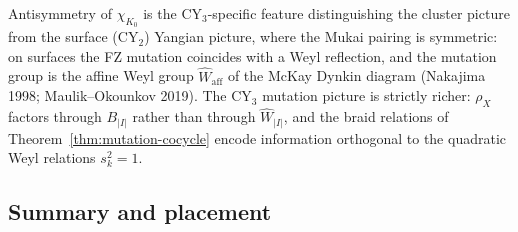 Antisymmetry of $\chi_{K_0}$ is the CY$_3$-specific feature distinguishing
the cluster picture from the surface (CY$_2$) Yangian picture, where the
Mukai pairing is symmetric: on surfaces the FZ mutation coincides with a
Weyl reflection, and the mutation group is the affine Weyl group
$\widehat{W}_{\mathrm{aff}}$ of the McKay Dynkin diagram (Nakajima 1998;
Maulik--Okounkov 2019). The CY$_3$ mutation picture is strictly richer:
$\rho_X$ factors through $B_{|I|}$ rather than through
$\widehat{W}_{|I|}$, and the braid relations of
Theorem~\ref{thm:mutation-cocycle} encode information orthogonal to the
quadratic Weyl relations $s_k^{2} = 1$.

\subsection{Summary and placement}


